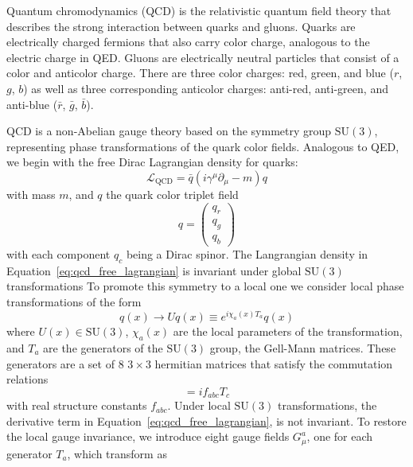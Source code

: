 Quantum chromodynamics (QCD) is the relativistic quantum field theory that describes the strong interaction between quarks and gluons. Quarks are electrically charged fermions that also carry color charge, analogous to the electric charge in QED\@. Gluons are electrically neutral particles that consist of a color and anticolor charge. There are three color charges: red, green, and blue ($r$, $g$, $b$) as well as three corresponding anticolor charges: anti-red, anti-green, and anti-blue ($\bar{r}$, $\bar{g}$, $\bar{b}$). 

QCD is a non-Abelian gauge theory based on the symmetry group $\mathrm{SU}(3)$, representing phase transformations of the quark color fields. Analogous to QED, we begin with the free Dirac Lagrangian density for quarks:
\begin{equation}
  \mathcal{L}_{\mathrm{QCD}} = \bar{q}(i\gamma^{\mu}\partial_{\mu} - m)q
  \label{eq:qcd_free_lagrangian}
\end{equation}
with mass $m$, and $q$ the quark color triplet field
\begin{equation}
  q = \begin{pmatrix}
    q_{r} \\
    q_{g} \\
    q_{b}
  \end{pmatrix}
  \label{eq:qcd_quark_field}
\end{equation}
with each component $q_{c}$ being a Dirac spinor. The Langrangian density in Equation~\ref{eq:qcd_free_lagrangian} is invariant under global $\mathrm{SU}(3)$ transformations To promote this symmetry to a local one we consider local phase transformations of the form
\begin{equation}
  q(x) \to Uq(x) \equiv e^{i\chi_{a}(x)T_{a}}q(x)
  \label{eq:qcd_local_symmetry}
\end{equation}
where $U(x) \in \mathrm{SU}(3)$, $\chi_{a}(x)$ are the local parameters of the transformation, and $T_{a}$ are the generators of the $\mathrm{SU}(3)$ group, the Gell-Mann matrices. These generators are a set of $8$ $3 \times 3$ hermitian matrices that satisfy the commutation relations
\begin{equation}
  [T_{a}, T_{b}] = i f_{abc}T_{c}
  \label{eq:qcd_commutation_relation}
\end{equation}
with real structure constants $f_{abc}$. Under local $\mathrm{SU}(3)$ transformations, the derivative term in Equation~\ref{eq:qcd_free_lagrangian}, is not invariant. To restore the local gauge invariance, we introduce eight gauge fields $G_{\mu}^{a}$, one for each generator $T_{a}$, which transform as
